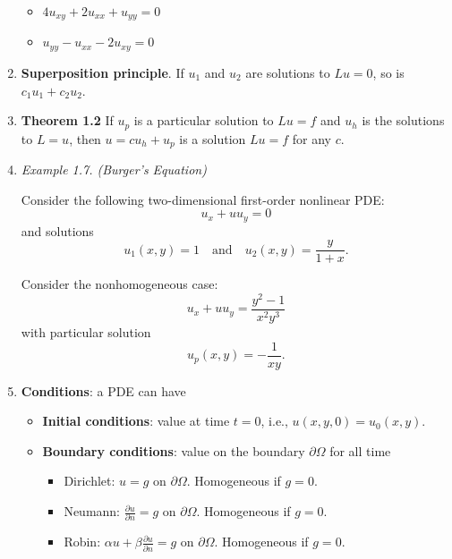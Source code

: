 \begin{enumerate}
\begin{itemize}
    \item $4u _{xy} + 2u _{xx} + u _{yy} = 0$
    \vspace{100pt}

    \item $u _{yy} - u _{xx} - 2u _{xy} = 0$
    \vspace{100pt}

\end{itemize}



\newpage

\item \textbf{Superposition principle}.
If $u_{1}$ and $u_{2}$ are solutions to $Lu=0$, so is $c_{1}u_{1}+c_{2}u_{2}$.

\item \textbf{Theorem 1.2} If $u_{p}$ is a particular solution to $Lu=f$ and $u_{h}$ is the solutions to $L=u$, then $u=cu_{h}+u_{p}$ is a solution $Lu=f$ for any $c$.

\item \textit{Example 1.7. (Burger’s Equation)}

Consider the following two-dimensional first-order nonlinear PDE:
\[u_{x}+uu_{y}=0\]
and solutions
\[u_{1}(x,y)=1 \quad \text{and} \quad u_{2}(x,y)=\frac{y}{1+x}.\]


\vspace{200pt}

Consider the nonhomogeneous case:
\[u_{x}+uu_{y}=\frac{y^{2}-1}{x^{2}y^{3}}\]
with particular solution
\[u_{p}(x,y)=-\frac{1}{xy}.\]





\newpage

\item \textbf{Conditions}: a PDE can have
\begin{itemize}
    \item \textbf{Initial conditions}: value at time $t=0$, i.e., $u(x,y,0)=u_{0}(x,y)$.
    \item \textbf{Boundary conditions}: value on the boundary $\partial\Omega$ for all time
    \begin{itemize}
        \item Dirichlet: $u=g$ on $\partial\Omega$. Homogeneous if $g=0$.
        \item Neumann: $\frac{\partial u}{\partial n} =g$ on $\partial\Omega$. Homogeneous if $g=0$.
        \item Robin: $\alpha u +\beta \frac{\partial u}{\partial n} = g$ on $\partial\Omega$. Homogeneous if $g=0$.
    \end{itemize}


\end{itemize}
\end{enumerate}
